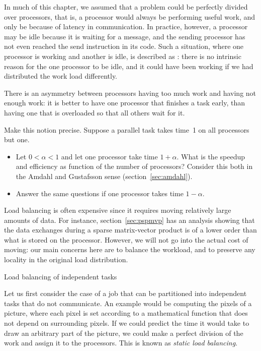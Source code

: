 In much of this chapter, we assumed that a problem could be perfectly
divided over processors, that is, a processor would always be
performing useful work, and only be 
because of latency in communication. In practice, however, a processor
may be idle because it is waiting for a message, and the sending
processor has not even reached the send instruction in its code. Such
a situation, where one processor is working and another is idle, is
described as : there is no intrinsic reason
for the one processor to be idle, and it could have been working if we
had distributed the work load differently.

There is an asymmetry between processors having too much work and
having not enough work: it is better to have one processor that
finishes a task early, than having one that is overloaded so that all
others wait for it.

\begin{exercise}
  Make this notion precise. Suppose a parallel task takes time~1 on
  all processors but one. 
  \begin{itemize}
  \item Let $0<\alpha<1$ and let one processor take time
    $1+\alpha$. What is the speedup and efficiency as function of the
    number of processors? Consider this both in the Amdahl and
    Gustafsson sense (section~\ref{sec:amdahl}).
  \item Answer the same questions if one processor takes time $1-\alpha$.
  \end{itemize}
\end{exercise}

Load balancing is often expensive since it requires moving relatively
large amounts of data. For instance, section~\ref{sec:pspmvp} has an
analysis showing that the data exchanges during a sparse matrix-vector
product is of a lower order than what is stored on the
processor. However, we will not go into the actual cost of moving: our
main concerns here are to balance the workload, and to preserve any
locality in the original load distribution.

 {Load balancing of independent tasks}

Let us first consider the case of a job that can be partitioned into
independent tasks that do not communicate. An example would be
computing the pixels of a  picture, where
each pixel is set according to a mathematical function that does not
depend on surrounding pixels. If we could predict the time it would
take to draw an arbitrary part of the picture, we could make a perfect
division of the work and assign it to the processors. This is known as
\emph{static load balancing}.

